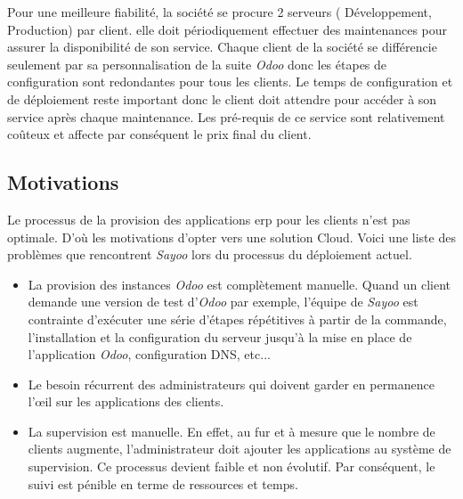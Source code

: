 \begin{onehalfspace}
Pour une meilleure fiabilité, la société se procure 2 serveurs ( Développement, Production) par client. elle doit périodiquement effectuer des maintenances pour assurer la disponibilité de son service. Chaque client de la société se différencie seulement par sa personnalisation de la suite \emph{Odoo} donc les étapes de configuration sont redondantes pour tous les clients. Le temps de configuration et de déploiement reste important donc le client doit attendre pour accéder à son service après chaque maintenance. Les pré-requis de ce service sont relativement coûteux et affecte par conséquent le prix final du client.
  
















\subsection{Motivations}

Le processus de la provision des applications \acrshort{erp} pour les clients n'est pas optimale. D'où les motivations d'opter vers une solution Cloud. Voici une liste des problèmes que rencontrent \emph{Sayoo} lors du processus du déploiement actuel.

\begin{itemize}

\item La provision des instances \emph{Odoo} est complètement manuelle. Quand un client demande une version de test d'\emph{Odoo} par exemple, l'équipe de \emph{Sayoo} est contrainte d'exécuter une série d'étapes répétitives à partir de la commande, l'installation et la configuration du serveur jusqu'à la mise en place de l'application \emph{Odoo}, configuration DNS, etc...

\item Le besoin récurrent des administrateurs qui doivent garder en permanence l’œil sur les applications des clients.

\item La supervision est manuelle. En effet, au fur et à mesure que le nombre de clients augmente, l'administrateur doit ajouter les applications au système de supervision. Ce processus devient faible et non évolutif. Par conséquent, le suivi est pénible en terme de ressources et temps.


\end{itemize}
\end{onehalfspace}
